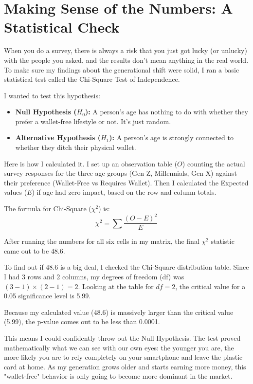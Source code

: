 \section{Making Sense of the Numbers: A Statistical Check}

When you do a survey, there is always a risk that you just got lucky (or unlucky) with the people you asked, and the results don't mean anything in the real world. To make sure my findings about the generational shift were solid, I ran a basic statistical test called the Chi-Square Test of Independence.

I wanted to test this hypothesis:
\begin{itemize}
    \item \textbf{Null Hypothesis ($H_0$):} A person's age has nothing to do with whether they prefer a wallet-free lifestyle or not. It's just random.
    \item \textbf{Alternative Hypothesis ($H_1$):} A person's age is strongly connected to whether they ditch their physical wallet.
\end{itemize}

Here is how I calculated it. I set up an observation table ($O$) counting the actual survey responses for the three age groups (Gen Z, Millennials, Gen X) against their preference (Wallet-Free vs Requires Wallet). Then I calculated the Expected values ($E$) if age had zero impact, based on the row and column totals.

The formula for Chi-Square ($\chi^2$) is:
\begin{equation}
\chi^2 = \sum \frac{(O - E)^2}{E}
\end{equation}

After running the numbers for all six cells in my matrix, the final $\chi^2$ statistic came out to be 48.6.

To find out if 48.6 is a big deal, I checked the Chi-Square distribution table. Since I had 3 rows and 2 columns, my degrees of freedom (df) was $(3-1) \times (2-1) = 2$. Looking at the table for $df=2$, the critical value for a 0.05 significance level is 5.99.

Because my calculated value (48.6) is massively larger than the critical value (5.99), the p-value comes out to be less than 0.0001.

This means I could confidently throw out the Null Hypothesis. The test proved mathematically what we can see with our own eyes: the younger you are, the more likely you are to rely completely on your smartphone and leave the plastic card at home. As my generation grows older and starts earning more money, this "wallet-free" behavior is only going to become more dominant in the market.